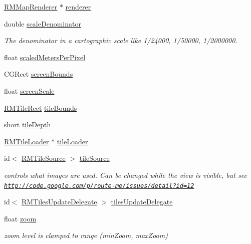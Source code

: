 \begin{DoxyCompactItemize}
\hyperlink{interface_r_m_map_renderer}{R\-M\-Map\-Renderer} $\ast$ \hyperlink{interface_r_m_map_contents_a5054d0d02002aa0757df91c9567d0cd9}{renderer}
\item 
double \hyperlink{interface_r_m_map_contents_a5f23576d9f94b8528a3886af2013144d}{scale\-Denominator}
\begin{DoxyCompactList}\small\item\em The denominator in a cartographic scale like 1/24000, 1/50000, 1/2000000. \end{DoxyCompactList}\item 
float \hyperlink{interface_r_m_map_contents_a1ad726ecd59ef33b559d35c8d1cef95e}{scaled\-Meters\-Per\-Pixel}
\item 
C\-G\-Rect \hyperlink{interface_r_m_map_contents_a658f2c0b02e7dded8f625329c658f925}{screen\-Bounds}
\item 
float \hyperlink{interface_r_m_map_contents_aeae93353d6604c3304d945da9490d809}{screen\-Scale}
\item 
\hyperlink{struct_r_m_tile_rect}{R\-M\-Tile\-Rect} \hyperlink{interface_r_m_map_contents_a385e41b3717e62ef1d343b73144c1ef4}{tile\-Bounds}
\item 
short \hyperlink{interface_r_m_map_contents_ad55a0b34afd6bd4b228f8ae3555f7d98}{tile\-Depth}
\item 
\hyperlink{interface_r_m_tile_loader}{R\-M\-Tile\-Loader} $\ast$ \hyperlink{interface_r_m_map_contents_ad7c6bc753e0b9a1cbaa5e9dcb4a5e853}{tile\-Loader}
\item 
id$<$ \hyperlink{protocol_r_m_tile_source-p}{R\-M\-Tile\-Source} $>$ \hyperlink{interface_r_m_map_contents_afdc2f45aee8bcc5633182450fdea0cfc}{tile\-Source}
\begin{DoxyCompactList}\small\item\em controls what images are used. Can be changed while the view is visible, but see \href{http://code.google.com/p/route-me/issues/detail?id=12}{\tt http\-://code.\-google.\-com/p/route-\/me/issues/detail?id=12} \end{DoxyCompactList}\item 
id$<$ \hyperlink{protocol_r_m_tiles_update_delegate-p}{R\-M\-Tiles\-Update\-Delegate} $>$ \hyperlink{interface_r_m_map_contents_a37fd1037d5c01ab7543a46056039ec77}{tiles\-Update\-Delegate}
\item 
float \hyperlink{interface_r_m_map_contents_a199c766d9970b90672f8884856c7cd4e}{zoom}
\begin{DoxyCompactList}\small\item\em zoom level is clamped to range (min\-Zoom, max\-Zoom) \end{DoxyCompactList}\end{DoxyCompactItemize}


